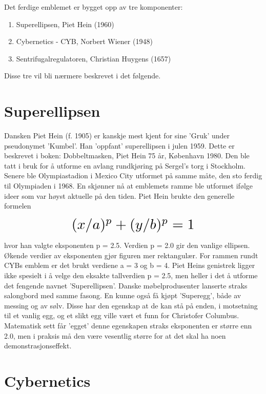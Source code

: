 Det ferdige emblemet er bygget opp av tre komponenter:

\begin{enumerate}
\item Superellipsen, Piet Hein (1960)
\item Cybernetics - CYB, Norbert Wiener (1948)
\item Sentrifugalregulatoren, Christian Huygens (1657)
\end{enumerate}

Disse tre vil bli nærmere beskrevet i det følgende.

\section{Superellipsen}

Dansken Piet Hein (f. 1905) er kanskje mest kjent for sine 'Gruk' under pseudonymet 'Kumbel'. Han 'oppfant' superellipsen i julen 1959. Dette er beskrevet i boken: Dobbeltmasken, Piet Hein 75 år, København 1980. Den ble tatt i bruk for å utforme en avlang rundkjøring på Sergel's torg i Stockholm. Senere ble Olympiastadion i Mexico City utformet på samme måte, den sto ferdig til Olympiaden i 1968. En skjønner nå at emblemets ramme ble utformet ifølge ideer som var høyst aktuelle på den tiden. Piet Hein brukte den generelle formelen

\[ \scalebox{2}{$(x / a)^p + (y / b)^p = 1$} \]

hvor han valgte eksponenten p = 2.5. Verdien p = 2.0 gir den vanlige ellipsen. Økende verdier av eksponenten gjør figuren mer rektangulær. For rammen rundt CYBs emblem er det brukt verdiene a = 3 og b = 4. Piet Heins genistrek ligger ikke spesielt i å velge den eksakte tallverdien p = 2.5, men heller i det å utforme det fengende navnet 'Superellipsen'. Danske møbelprodusenter lanserte straks salongbord med samme fasong. En kunne også få kjøpt 'Superegg', både av messing og av sølv. Disse har den egenskap at de kan stå på enden, i motsetning til et vanlig egg, og et slikt egg ville vært et funn for Christofer Columbus. Matematisk sett får 'egget' denne egenskapen straks eksponenten er større enn 2.0, men i praksis må den være vesentlig større for at det skal ha noen demonstrasjonseffekt.

\section{Cybernetics}

